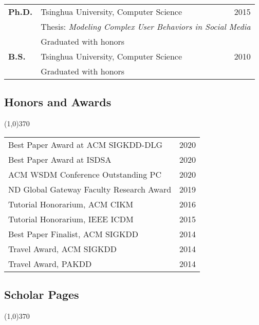 \documentclass[10pt]{article}
\newcounter{list}
\begin{document}
\begin{table}[h!]
\begin{tabular*}{12.7cm}{p{1.15cm}p{10.00cm}r}
\bf{Ph.D.}&Tsinghua University, Computer Science&2015\\
 &\multicolumn{2}{l}{\small Thesis: \textit{Modeling Complex User Behaviors in Social Media}}\\
 &\multicolumn{2}{l}{\small Graduated with honors}\\	
\bf{B.S.}&Tsinghua University, Computer Science&2010\\
 &\multicolumn{2}{l}{\small Graduated with honors}\\	

\end{tabular*}
\end{table}

\vspace{-0.6cm}
\subsection{\sc Honors and Awards}
\vspace{-0.4cm} \line(1,0){370} \vspace{-0.1cm}

\begin{table}[h!]
\begin{tabular*}{12.7cm}{p{11.65cm}r}
Best Paper Award at ACM SIGKDD-DLG & 2020 \\	
Best Paper Award at ISDSA & 2020 \\
ACM WSDM Conference Outstanding PC & 2020 \\
ND Global Gateway Faculty Research Award & 2019 \\
Tutorial Honorarium, ACM CIKM & 2016 \\
Tutorial Honorarium, IEEE ICDM & 2015 \\
Best Paper Finalist, ACM SIGKDD & 2014 \\
Travel Award, ACM SIGKDD & 2014 \\
Travel Award, PAKDD & 2014 \\
\end{tabular*}
\end{table}

\vspace{-0.6cm}
\subsection{\sc Scholar Pages}
\vspace{-0.4cm} \line(1,0){370} \vspace{-0.1cm}
\end{document}
